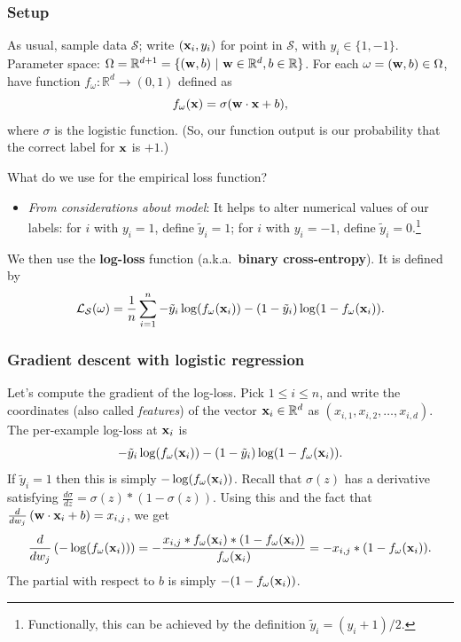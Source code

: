 \documentclass{beamer}
\theoremstyle{example}
\begin{document}
\begin{frame}
\frametitle{Setup}
As usual, sample data $\mathcal S$; write $({\bf x}_i, y_i)$ for point in $\mathcal S$, with $y_i\in\{1, -1\}$. \newline 
Parameter space: $\Omega = \mathbb R^{d+1} = \{({\bf w},b)\ |\ {\bf w}\in\mathbb R^d, b\in\mathbb R\}$. For each $\omega = ({\bf w},b) \in \Omega$, have function $f_{\omega}:\mathbb R^d\to(0,1)$ defined as 
        \[f_{\omega}({\bf x}) = \sigma({\bf w}\cdot{\bf x} + b),\]
where $\sigma$ is the logistic function. (So, our function output is our probability that the correct label for ${\bf x}$ is $+1$.)

\vspace*{12pt}
What do we use for the empirical loss function? 

\begin{itemize}
    \item \textit{From considerations about model}: It helps to alter numerical values of our labels: for $i$ with $y_i=1$, define $\tilde y_i = 1$; for $i$ with $y_i=-1$, define $\tilde y_i = 0$.\footnote{Functionally, this can be achieved by the definition $\tilde y_i = (y_i+1)/2$.}
\end{itemize}

\pause
We then use the \textbf{log-loss} function (a.k.a.\ \textbf{binary cross-entropy}). It is defined by 
    \[\mathcal L_{\mathcal S}(\omega) = \frac{1}{n}\sum_{i=1}^n -\tilde y_i\log(f_{\omega}({\bf x}_i)) - (1-\tilde y_i)\log(1 - f_{\omega}({\bf x}_i)) .\]
\end{frame}

\begin{frame}
\frametitle{Gradient descent with logistic regression}
Let's compute the gradient of the log-loss. Pick $1\le i\le n$, and write the coordinates (also called \textit{features}) of the vector ${\bf x}_i\in\mathbb R^d$ as $(x_{i,1},x_{i,2},\ldots,x_{i,d})$.\newline \pause
The per-example log-loss at ${\bf x}_i$ is 
        \[-\tilde y_i\log(f_{\omega}({\bf x}_i)) - (1-\tilde y_i)\log(1 - f_{\omega}({\bf x}_i)).\]
\pause
If $\tilde y_i = 1$ then this is simply $-\log(f_{\omega}({\bf x}_i))$. Recall that $\sigma(z)$ has a derivative satisfying $\frac{d\sigma}{dz} = \sigma(z)\ast(1 - \sigma(z))$. \pause Using this and the fact that $\frac{d}{dw_j}\left({\bf w}\cdot{\bf x}_i + b\right) = x_{i,j}$, we get 
        \[\frac{d}{dw_j}\left( -\log(f_{\omega}({\bf x}_i)) \right) = - \frac{x_{i,j}\ast f_{\omega}({\bf x}_i)\ast(1 - f_{\omega}({\bf x}_i))}{f_{\omega}({\bf x}_i)} = -x_{i,j}\ast(1-f_{\omega}({\bf x}_i)).\]
\pause
The partial with respect to $b$ is simply $-(1-f_{\omega}({\bf x}_i))$.

\end{frame}
\end{document}
